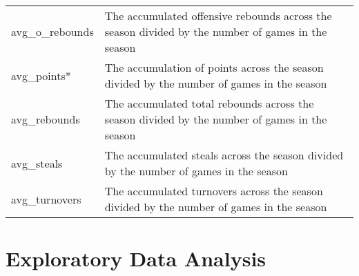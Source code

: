 \documentclass[
]{article}
\begin{document}
\begin{longtable}[]{@{}ll@{}}
\begin{minipage}[t]{0.37\columnwidth}
avg\_o\_rebounds\strut
\end{minipage} & \begin{minipage}[t]{0.57\columnwidth}\raggedright
The accumulated offensive rebounds across the season divided by the
number of games in the season\strut
\end{minipage}\tabularnewline
\begin{minipage}[t]{0.37\columnwidth}\raggedright
avg\_points*\strut
\end{minipage} & \begin{minipage}[t]{0.57\columnwidth}\raggedright
The accumulation of points across the season divided by the number of
games in the season\strut
\end{minipage}\tabularnewline
\begin{minipage}[t]{0.37\columnwidth}\raggedright
avg\_rebounds\strut
\end{minipage} & \begin{minipage}[t]{0.57\columnwidth}\raggedright
The accumulated total rebounds across the season divided by the number
of games in the season\strut
\end{minipage}\tabularnewline
\begin{minipage}[t]{0.37\columnwidth}\raggedright
avg\_steals\strut
\end{minipage} & \begin{minipage}[t]{0.57\columnwidth}\raggedright
The accumulated steals across the season divided by the number of games
in the season\strut
\end{minipage}\tabularnewline
\begin{minipage}[t]{0.37\columnwidth}\raggedright
avg\_turnovers\strut
\end{minipage} & \begin{minipage}[t]{0.57\columnwidth}\raggedright
The accumulated turnovers across the season divided by the number of
games in the season\strut
\end{minipage}\tabularnewline
\bottomrule
\end{longtable}

\hypertarget{exploratory-data-analysis}{%
\section{Exploratory Data Analysis}\label{exploratory-data-analysis}}
\end{document}
